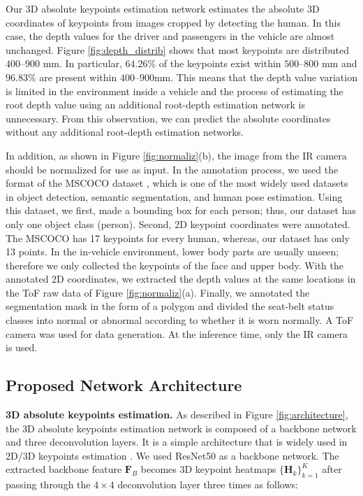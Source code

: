 \documentclass[letterpaper]{article} %
\begin{document}
Our 3D absolute keypoints estimation network estimates the absolute 3D coordinates of keypoints from images cropped by detecting the human. In this case, the depth values for the driver and passengers in the vehicle are almost unchanged. Figure \ref{fig:depth_distrib} shows that most keypoints are distributed $400$--$900$ mm. In particular, $64.26\%$ of the keypoints exist within $500$--$800$ mm and $96.83\%$ are present within $400$--$900$mm. This means that the depth value variation is limited in the environment inside a vehicle and the process of estimating the root depth value using an additional root-depth estimation network is unnecessary. From this observation, we can predict the absolute coordinates without any additional root-depth estimation networks.

In addition, as shown in Figure \ref{fig:normaliz}(b), the image from the IR camera should be normalized for use as input. In the annotation process, we used the format of the MSCOCO dataset \cite{lin2014microsoft}, which is one of the most widely used datasets in object detection, semantic segmentation, and human pose estimation. Using this dataset, we first, made a bounding box for each person; thus, our dataset has only one object class (person). Second, 2D keypoint coordinates were annotated. The MSCOCO has 17 keypoints for every human, whereas, our dataset has only 13 points. 
In the in-vehicle environment, lower body parts are usually unseen; therefore we only collected the keypoints of the face and upper body. With the annotated 2D coordinates, we extracted the depth values at the same locations in the ToF raw data of Figure \ref{fig:normaliz}(a). Finally, we annotated the segmentation mask in the form of a polygon and divided the seat-belt status classes into normal or abnormal according to whether it is worn normally. A ToF camera was used for data generation. At the inference time, only the IR camera is used.

\subsection{Proposed Network Architecture}
\textbf{3D absolute keypoints estimation.} As described in Figure \ref{fig:architecture}, the 3D absolute keypoints estimation network is composed of a backbone network and three deconvolution layers. It is a simple architecture that is widely used in 2D/3D keypoints estimation \cite{xiao2018simple, moon2019camera}. We used ResNet50 \cite{he2016identity} as a backbone network. The extracted backbone feature $\textbf{F}_{B}$ becomes 3D keypoint heatmaps $\{{\mathbf H}_{k}\}_{k=1}^{K}$ after passing through the $4\times4$ deconvolution layer three times as follows:
\end{document}
